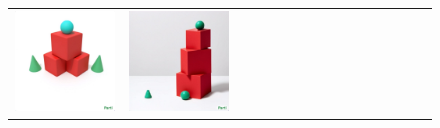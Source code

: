\begin{figure}
\begin{adjustwidth}{-0.8in}{-0.5in}
\begin{tabular}{cccccccccccccccccccc}
\multicolumn{3}{c}{\includegraphics[width=\twobytwocolwidth\textwidth]{figures/limitations/cube_cone1.jpg}} &
\multicolumn{3}{c}{\includegraphics[width=\twobytwocolwidth\textwidth]{figures/limitations/cube_cone2.jpg}} \\

\end{tabular}
\end{adjustwidth}
\end{figure}
